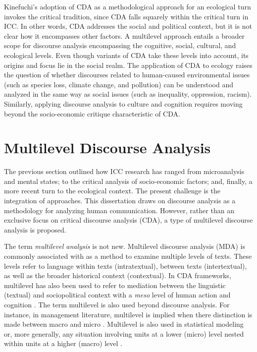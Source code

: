 Kinefuchi's adoption of CDA as a methodological approach for an ecological turn invokes the critical tradition, since CDA falls squarely within the critical turn in ICC. In other words, CDA addresses the social and political context, but it is not clear how it encompasses other factors. A multilevel approach entails a broader scope for discourse analysis encompassing the cognitive, social, cultural, and ecological levels. Even though variants of CDA take these levels into account, its origins and focus lie in the social realm. The application of CDA to ecology raises the question of whether discourses related to human-caused environmental issues (such as species loss, climate change, and pollution) can be understood and analyzed in the same way as social issues (such as inequality, oppression, racism). Similarly, applying discourse analysis to culture and cognition requires moving beyond the socio-economic critique characteristic of CDA. 

\section{Multilevel Discourse Analysis}

The previous section outlined how ICC research has ranged from microanalysis and mental states; to the critical analysis of socio-economic factors; and, finally, a more recent turn to the ecological context. The present challenge is the integration of approaches. This dissertation draws on discourse analysis as a methodology for analyzing human communication. However, rather than an exclusive focus on critical discourse analysis (CDA), a type of multilevel discourse analysis is proposed.

The term \textit{multilevel analysis} is not new. Multilevel discourse analysis (MDA) is commonly associated with \cite*{Fairclough1992, N.2003} as a method to examine  multiple levels of texts. These levels refer to language within texts (intratextual), between texts (intertextual), as well as the broader historical context (contextual). In CDA frameworks, multilevel has also been used to refer to mediation between the linguistic (textual) and sociopolitical context with a \textit{meso} level of human action and cognition \citep[e.g.,][]{Trimithiotis2018}. The term multilevel is also used beyond discourse analysis. For instance, in management literature, multilevel is implied when there distinction is made between macro and micro \citep[e.g.,][]{Bitektine2014}. Multilevel is also used in statistical modeling or, more generally, any situation involving units at a lower (micro) level nested within units at a higher (macro) level \citep{DiezRoux2002}.   

